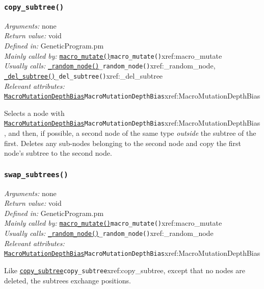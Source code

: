 \documentclass[a4paper]{article}
\begin{document}
\subsubsection{\texttt{copy\_subtree()}}\label{xref:copy_subtree}
\begin{flushleft}
\textit{Arguments:} none\\
\textit{Return value:} void\\
\textit{Defined in:} GeneticProgram.pm\\
\textit{Mainly called by:} \hyperref[no]{\texttt{macro\_mutate()}}{\texttt{macro\_mutate()}}{xref:macro_mutate}\\
\textit{Usually calls:} \hyperref[no]{\texttt{\_random\_node()}}{\texttt{\_random\_node()}}{xref:_random_node}, \hyperref[no]{\texttt{\_del\_subtree()}}{\texttt{\_del\_subtree()}}{xref:_del_subtree}\\
\textit{Relevant attributes:} \hyperref[no]{\texttt{MacroMutationDepthBias}}{\texttt{MacroMutationDepthBias}}{xref:MacroMutationDepthBias}
\end{flushleft}

Selects a node with \hyperref[no]{\texttt{MacroMutationDepthBias}}{\texttt{MacroMutationDepthBias}}{xref:MacroMutationDepthBias}, and then, if
possible, a second node of the same type \textit{outside} the subtree
of the first.  Deletes any sub-nodes belonging to the second node and
copy the first node's subtree to the second node.

\subsubsection{\texttt{swap\_subtrees()}}\label{xref:swap_subtrees}
\begin{flushleft}
\textit{Arguments:} none\\
\textit{Return value:} void\\
\textit{Defined in:} GeneticProgram.pm\\
\textit{Mainly called by:} \hyperref[no]{\texttt{macro\_mutate()}}{\texttt{macro\_mutate()}}{xref:macro_mutate}\\
\textit{Usually calls:} \hyperref[no]{\texttt{\_random\_node()}}{\texttt{\_random\_node()}}{xref:_random_node}\\
\textit{Relevant attributes:} \hyperref[no]{\texttt{MacroMutationDepthBias}}{\texttt{MacroMutationDepthBias}}{xref:MacroMutationDepthBias}
\end{flushleft}

Like \hyperref[no]{\texttt{copy\_subtree}}{\texttt{copy\_subtree}}{xref:copy_subtree}, except that no nodes are deleted, the
subtrees exchange positions.
\end{document}
